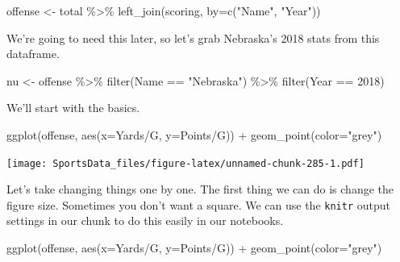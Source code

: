 \documentclass[
]{book}
\newenvironment{Shaded}{\begin{snugshade}}{\end{snugshade}}
\newcommand{\AttributeTok}[1]{\textcolor[rgb]{0.77,0.63,0.00}{#1}}
\newcommand{\DecValTok}[1]{\textcolor[rgb]{0.00,0.00,0.81}{#1}}
\newcommand{\FunctionTok}[1]{\textcolor[rgb]{0.00,0.00,0.00}{#1}}
\newcommand{\NormalTok}[1]{#1}
\newcommand{\OtherTok}[1]{\textcolor[rgb]{0.56,0.35,0.01}{#1}}
\newcommand{\SpecialCharTok}[1]{\textcolor[rgb]{0.00,0.00,0.00}{#1}}
\newcommand{\StringTok}[1]{\textcolor[rgb]{0.31,0.60,0.02}{#1}}
\begin{document}
\begin{Shaded}
\begin{Highlighting}[]
\NormalTok{offense }\OtherTok{\textless{}{-}}\NormalTok{ total }\SpecialCharTok{\%\textgreater{}\%} \FunctionTok{left\_join}\NormalTok{(scoring, }\AttributeTok{by=}\FunctionTok{c}\NormalTok{(}\StringTok{"Name"}\NormalTok{, }\StringTok{"Year"}\NormalTok{))}
\end{Highlighting}
\end{Shaded}

We're going to need this later, so let's grab Nebraska's 2018 stats from this dataframe.

\begin{Shaded}
\begin{Highlighting}[]
\NormalTok{nu }\OtherTok{\textless{}{-}}\NormalTok{ offense }\SpecialCharTok{\%\textgreater{}\%} \FunctionTok{filter}\NormalTok{(Name }\SpecialCharTok{==} \StringTok{"Nebraska"}\NormalTok{) }\SpecialCharTok{\%\textgreater{}\%} \FunctionTok{filter}\NormalTok{(Year }\SpecialCharTok{==} \DecValTok{2018}\NormalTok{)}
\end{Highlighting}
\end{Shaded}

We'll start with the basics.

\begin{Shaded}
\begin{Highlighting}[]
\FunctionTok{ggplot}\NormalTok{(offense, }\FunctionTok{aes}\NormalTok{(}\AttributeTok{x=}\StringTok{\textasciigrave{}}\AttributeTok{Yards/G}\StringTok{\textasciigrave{}}\NormalTok{, }\AttributeTok{y=}\StringTok{\textasciigrave{}}\AttributeTok{Points/G}\StringTok{\textasciigrave{}}\NormalTok{)) }\SpecialCharTok{+} 
  \FunctionTok{geom\_point}\NormalTok{(}\AttributeTok{color=}\StringTok{"grey"}\NormalTok{)}
\end{Highlighting}
\end{Shaded}

\texttt{[image: SportsData\_files/figure-latex/unnamed-chunk-285-1.pdf]}

Let's take changing things one by one. The first thing we can do is change the figure size. Sometimes you don't want a square. We can use the \texttt{knitr} output settings in our chunk to do this easily in our notebooks.

\begin{Shaded}
\begin{Highlighting}[]
\FunctionTok{ggplot}\NormalTok{(offense, }\FunctionTok{aes}\NormalTok{(}\AttributeTok{x=}\StringTok{\textasciigrave{}}\AttributeTok{Yards/G}\StringTok{\textasciigrave{}}\NormalTok{, }\AttributeTok{y=}\StringTok{\textasciigrave{}}\AttributeTok{Points/G}\StringTok{\textasciigrave{}}\NormalTok{)) }\SpecialCharTok{+} 
  \FunctionTok{geom\_point}\NormalTok{(}\AttributeTok{color=}\StringTok{"grey"}\NormalTok{)}
\end{Highlighting}
\end{Shaded}
\end{document}
